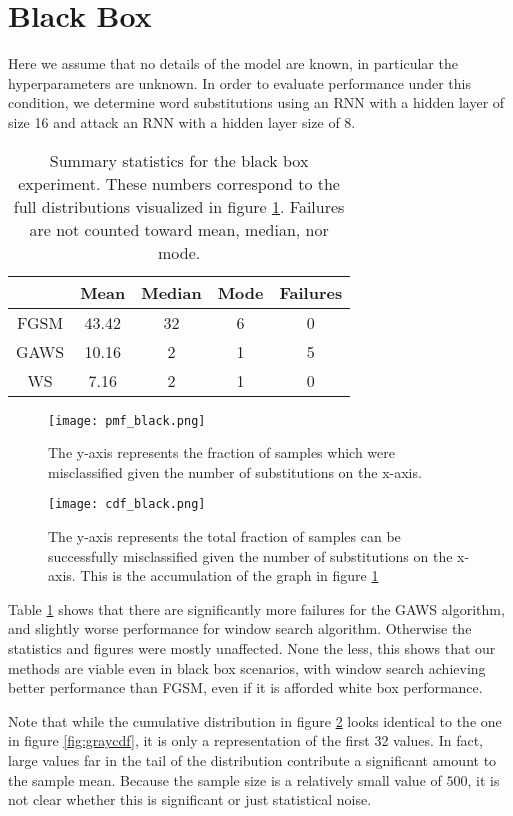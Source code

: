 \section{Black Box}
Here we assume that no details of the model are known, in particular the hyperparameters are unknown.  In order to evaluate performance under this condition, we determine word substitutions using an RNN with a hidden layer of size 16 and attack an RNN with a hidden layer size of 8.
\begin{table}
\centering
\begin{tabular}{ |c|c|c|c|c| } \hline
& Mean & Median & Mode & Failures\\ \hline
FGSM & 43.42 & 32 & 6 & 0\\ \hline
GAWS & 10.16 & 2 & 1 & 5\\ \hline
WS & 7.16 & 2 & 1 & 0\\ \hline
\end{tabular}
\caption{Summary statistics for the black box experiment.  These numbers correspond to the full distributions visualized in figure \ref{fig:blackpmf}.  Failures are not counted toward mean, median, nor mode.}
\label{tab:blacksum}
\end{table}
\begin{figure}
    \centering
    \texttt{[image: pmf\_black.png]}
    \caption{The y-axis represents the fraction of samples which were misclassified given the number of substitutions on the x-axis.}
    \label{fig:blackpmf}
\end{figure}

\begin{figure}
    \centering
    \texttt{[image: cdf\_black.png]}
    \caption{The y-axis represents the total fraction of samples can be successfully misclassified given the number of substitutions on the x-axis.  This is the accumulation of the graph in figure \ref{fig:blackpmf}}
    \label{fig:blackcdf}
\end{figure}

Table \ref{tab:blacksum} shows that there are significantly more failures for the GAWS algorithm, and slightly worse performance for window search algorithm.  Otherwise the statistics and figures were mostly unaffected.  None the less, this shows that our methods are viable even in black box scenarios, with window search achieving better performance than FGSM, even if it is afforded white box performance.

Note that while the cumulative distribution in figure \ref{fig:blackcdf} looks identical to the one in figure \ref{fig:graycdf}, it is only a representation of the first 32 values.  In fact, large values far in the tail of the distribution contribute a significant amount to the sample mean.  Because the sample size is a relatively small value of $500$, it is not clear whether this is significant or just statistical noise.
